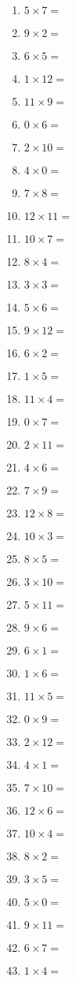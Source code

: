 \documentclass{article}
\begin{document}
\begin{multicols}{4}
\begin{enumerate}[label=\arabic*.,itemsep=0pt,parsep=0pt]
\item $5 \times 7 =$
\item $9 \times 2 =$
\item $6 \times 5 =$
\item $1 \times 12 =$
\item $11 \times 9 =$
\item $0 \times 6 =$
\item $2 \times 10 =$
\item $4 \times 0 =$
\item $7 \times 8 =$
\item $12 \times 11 =$
\item $10 \times 7 =$
\item $8 \times 4 =$
\item $3 \times 3 =$
\item $5 \times 6 =$
\item $9 \times 12 =$
\item $6 \times 2 =$
\item $1 \times 5 =$
\item $11 \times 4 =$
\item $0 \times 7 =$
\item $2 \times 11 =$
\item $4 \times 6 =$
\item $7 \times 9 =$
\item $12 \times 8 =$
\item $10 \times 3 =$
\item $8 \times 5 =$
\item $3 \times 10 =$
\item $5 \times 11 =$
\item $9 \times 6 =$
\item $6 \times 1 =$
\item $1 \times 6 =$
\item $11 \times 5 =$
\item $0 \times 9 =$
\item $2 \times 12 =$
\item $4 \times 1 =$
\item $7 \times 10 =$
\item $12 \times 6 =$
\item $10 \times 4 =$
\item $8 \times 2 =$
\item $3 \times 5 =$
\item $5 \times 0 =$
\item $9 \times 11 =$
\item $6 \times 7 =$
\item $1 \times 4 =$

\end{enumerate}
\end{multicols}
\end{document}
